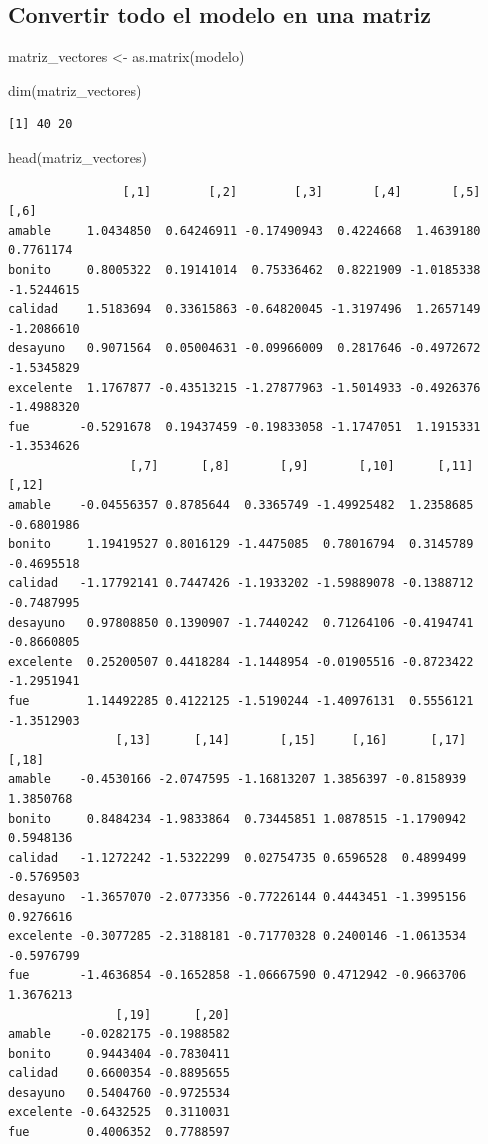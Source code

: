 \documentclass[
  letterpaper,
  DIV=11,
  numbers=noendperiod]{scrreprt}
\newenvironment{Shaded}{\begin{snugshade}}{\end{snugshade}}
\newcommand{\FunctionTok}[1]{\textcolor[rgb]{0.28,0.35,0.67}{#1}}
\newcommand{\NormalTok}[1]{\textcolor[rgb]{0.00,0.23,0.31}{#1}}
\newcommand{\OtherTok}[1]{\textcolor[rgb]{0.00,0.23,0.31}{#1}}
\begin{document}
\subsection{Convertir todo el modelo en una
matriz}\label{convertir-todo-el-modelo-en-una-matriz}

\begin{Shaded}
\begin{Highlighting}[]
\NormalTok{matriz\_vectores }\OtherTok{\textless{}{-}} \FunctionTok{as.matrix}\NormalTok{(modelo)}

\FunctionTok{dim}\NormalTok{(matriz\_vectores)}
\end{Highlighting}
\end{Shaded}

\begin{verbatim}
[1] 40 20
\end{verbatim}

\begin{Shaded}
\begin{Highlighting}[]
\FunctionTok{head}\NormalTok{(matriz\_vectores)}
\end{Highlighting}
\end{Shaded}

\begin{verbatim}
                [,1]        [,2]        [,3]       [,4]       [,5]       [,6]
amable     1.0434850  0.64246911 -0.17490943  0.4224668  1.4639180  0.7761174
bonito     0.8005322  0.19141014  0.75336462  0.8221909 -1.0185338 -1.5244615
calidad    1.5183694  0.33615863 -0.64820045 -1.3197496  1.2657149 -1.2086610
desayuno   0.9071564  0.05004631 -0.09966009  0.2817646 -0.4972672 -1.5345829
excelente  1.1767877 -0.43513215 -1.27877963 -1.5014933 -0.4926376 -1.4988320
fue       -0.5291678  0.19437459 -0.19833058 -1.1747051  1.1915331 -1.3534626
                 [,7]      [,8]       [,9]       [,10]      [,11]      [,12]
amable    -0.04556357 0.8785644  0.3365749 -1.49925482  1.2358685 -0.6801986
bonito     1.19419527 0.8016129 -1.4475085  0.78016794  0.3145789 -0.4695518
calidad   -1.17792141 0.7447426 -1.1933202 -1.59889078 -0.1388712 -0.7487995
desayuno   0.97808850 0.1390907 -1.7440242  0.71264106 -0.4194741 -0.8660805
excelente  0.25200507 0.4418284 -1.1448954 -0.01905516 -0.8723422 -1.2951941
fue        1.14492285 0.4122125 -1.5190244 -1.40976131  0.5556121 -1.3512903
               [,13]      [,14]       [,15]     [,16]      [,17]      [,18]
amable    -0.4530166 -2.0747595 -1.16813207 1.3856397 -0.8158939  1.3850768
bonito     0.8484234 -1.9833864  0.73445851 1.0878515 -1.1790942  0.5948136
calidad   -1.1272242 -1.5322299  0.02754735 0.6596528  0.4899499 -0.5769503
desayuno  -1.3657070 -2.0773356 -0.77226144 0.4443451 -1.3995156  0.9276616
excelente -0.3077285 -2.3188181 -0.71770328 0.2400146 -1.0613534 -0.5976799
fue       -1.4636854 -0.1652858 -1.06667590 0.4712942 -0.9663706  1.3676213
               [,19]      [,20]
amable    -0.0282175 -0.1988582
bonito     0.9443404 -0.7830411
calidad    0.6600354 -0.8895655
desayuno   0.5404760 -0.9725534
excelente -0.6432525  0.3110031
fue        0.4006352  0.7788597
\end{verbatim}
\end{document}
